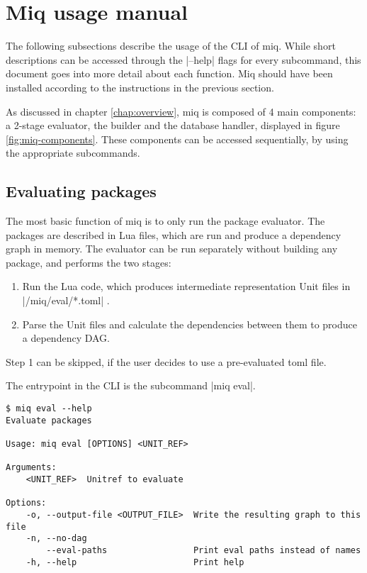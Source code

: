 \section{Miq usage manual}

The following subsections describe the usage of the \ac{CLI}
of miq. While short descriptions can be accessed through the
|--help| flags for every subcommand, this document goes into
more detail about each function.
Miq should have been installed according to the instructions
in the previous section.

As discussed in chapter
\ref{chap:overview}, miq is composed of 4 main components: a
2-stage evaluator, the builder and the database handler,
displayed in figure \ref{fig:miq-components}. These
components can be accessed sequentially, by using the
appropriate subcommands.

\subsection{Evaluating packages}
\label{sec:eval}

The most basic function of miq is to only run the package
evaluator. The packages are described in Lua files, which
are run and produce a dependency graph in memory. The
evaluator can be run separately without building any
package, and performs the two stages:

\begin{enumerate}
    \item Run the Lua code, which produces intermediate
    representation Unit files in |/miq/eval/*.toml| .
    \item Parse the Unit files and calculate the
    dependencies between them to produce a dependency \ac{DAG}.
\end{enumerate}

Step 1 can be skipped, if the user decides to use a
pre-evaluated toml file.

The entrypoint in the \ac{CLI} is the subcommand |miq eval|.

\begin{verbatim}
$ miq eval --help
Evaluate packages

Usage: miq eval [OPTIONS] <UNIT_REF>

Arguments:
    <UNIT_REF>  Unitref to evaluate

Options:
    -o, --output-file <OUTPUT_FILE>  Write the resulting graph to this file
    -n, --no-dag
        --eval-paths                 Print eval paths instead of names
    -h, --help                       Print help
\end{verbatim}

